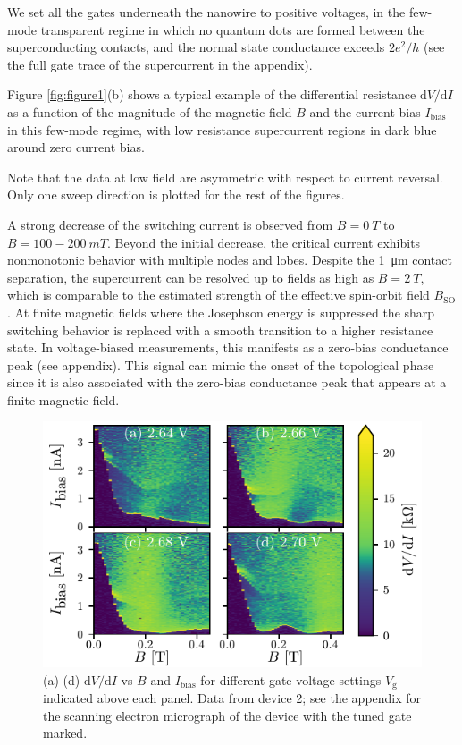 We set all the gates underneath the nanowire to positive voltages, in the few-mode transparent regime in which no quantum dots are formed between the superconducting contacts, and the normal state conductance exceeds $2e^2/h$ (see the full gate trace of the supercurrent in the appendix).

Figure \ref{fig:figure1}(b) shows a typical example of the differential resistance $\mathrm{d}V/\mathrm{d}I$ as a function of the magnitude of the magnetic field $B$ and the current bias $I_\mathrm{bias}$ in this few-mode regime, with low resistance supercurrent regions in dark blue around zero current bias.

Note that the data at low field are asymmetric with respect to current reversal. Only one sweep direction is plotted for the rest of the figures.

A strong decrease of the switching current is observed from $B=\SI{0}{T}$ to $B=100-\SI{200}{mT}$.
Beyond the initial decrease, the critical current exhibits nonmonotonic behavior with multiple nodes and lobes.
Despite the \SI{1}{\micro \meter} contact separation, the supercurrent can be resolved up to fields as high as $B=\SI{2}{T}$, which is comparable to the estimated strength of the effective spin-orbit field $B_\mathrm{SO}$.
At finite magnetic fields where the Josephson energy is suppressed the sharp switching behavior is replaced with a smooth transition to a higher resistance state.
In voltage-biased measurements, this manifests as a zero-bias conductance peak (see appendix).
This signal can mimic the onset of the topological phase since it is also associated with the zero-bias conductance peak that appears at a finite magnetic field.

\begin{figure}
\begin{center}
\includegraphics[width=0.7\columnwidth]{chapter_supercurrent/figures/fig2.pdf}
\caption{(a)-(d) $\mathrm{d}V/\mathrm{d}I$ vs $B$ and $I_\mathrm{bias}$ for different gate voltage settings $V_\mathrm{g}$ indicated above each panel.  Data from device 2; see the appendix for the scanning electron micrograph of the device with the tuned gate marked.}
\label{fig:figure2}
\end{center}
\end{figure}


